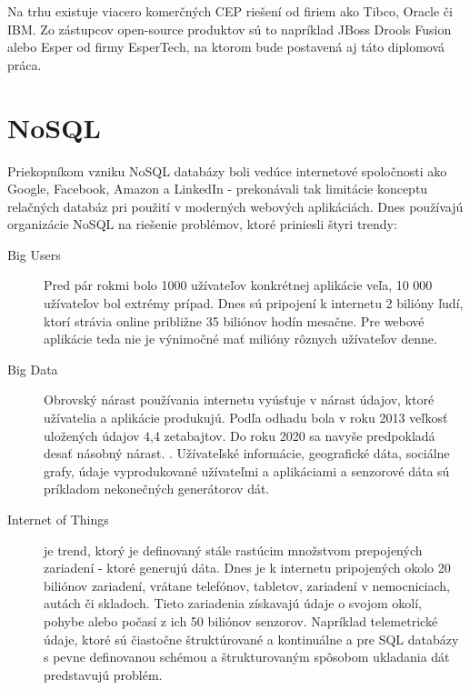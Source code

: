 	Na trhu existuje viacero komerčných CEP riešení od firiem ako Tibco, Oracle či IBM. Zo zástupcov open-source produktov sú to napríklad JBoss Drools Fusion alebo Esper od firmy EsperTech, na ktorom bude postavená aj táto diplomová práca.

\section{NoSQL}
	Priekopníkom vzniku NoSQL databázy boli vedúce internetové spoločnosti ako Google, Facebook, Amazon a LinkedIn - prekonávali tak limitácie konceptu relačných databáz pri použití v moderných webových aplikáciách. Dnes používajú organizácie NoSQL na riešenie problémov, ktoré priniesli štyri trendy: \cite{nosql}
	\begin{description}
		\item[Big Users] Pred pár rokmi bolo 1000 užívateľov konkrétnej aplikácie veľa, 10 000 užívateľov bol extrémy prípad. Dnes sú pripojení k internetu 2 bilióny ľudí, ktorí strávia online približne 35 biliónov hodín mesačne. Pre webové aplikácie teda nie je výnimočné mať milióny rôznych užívateľov denne.
		
		\item[Big Data] Obrovský nárast používania internetu vyúsťuje v nárast údajov, ktoré užívatelia a aplikácie produkujú. Podľa odhadu bola v roku 2013 veľkosť uložených údajov 4,4 zetabajtov. Do roku 2020 sa navyše predpokladá desať násobný nárast. \cite{web:idc-bigdata}. Užívateľské informácie, geografické dáta, sociálne grafy, údaje vyprodukované užívateľmi a aplikáciami a senzorové dáta sú príkladom nekonečných generátorov dát.
		
		\item[Internet of Things] je trend, ktorý je definovaný stále rastúcim množstvom prepojených zariadení - ktoré generujú dáta. Dnes je k internetu pripojených okolo 20 biliónov zariadení, vrátane telefónov, tabletov, zariadení v nemocniciach, autách či skladoch. Tieto zariadenia získavajú údaje o svojom okolí, pohybe alebo počasí z ich 50 biliónov senzorov. \cite{nosql}
		Napríklad telemetrické údaje, ktoré sú čiastočne štruktúrované a kontinuálne a pre SQL databázy s pevne definovanou schémou a štrukturovaným spôsobom ukladania dát predstavujú problém.
		

\end{description}
